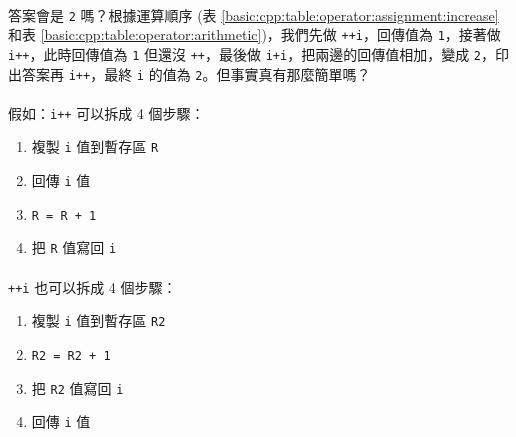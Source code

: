 \documentclass[12pt,a4paper,oneside]{article}
\begin{document}
\begin{CJK}{UTF8}{bkai}
\paragraph{}答案會是 \lstinline!2! 嗎？根據運算順序 (表 \ref{basic:cpp:table:operator:assignment:increase} 和表 \ref{basic:cpp:table:operator:arithmetic})，我們先做 \lstinline!++i!，回傳值為 \lstinline!1!，接著做 \lstinline!i++!，此時回傳值為 \lstinline!1! 但還沒 \lstinline!++!，最後做 \lstinline!i+i!，把兩邊的回傳值相加，變成 \lstinline!2!，印出答案再 \lstinline!i++!，最終 \lstinline!i! 的值為 \lstinline!2!。但事實真有那麼簡單嗎？

\paragraph{}假如：\lstinline!i++! 可以拆成 4 個步驟：
\begin{enumerate}
\item {\color{blue}複製 \lstinline!i! 值到暫存區 \lstinline!R!}
\item {\color{blue}回傳 \lstinline!i! 值}
\item {\color{blue}\lstinline!R = R + 1!}
\item {\color{blue}把 \lstinline!R! 值寫回 \lstinline!i!}
\end{enumerate}

\paragraph{}\lstinline!++i! 也可以拆成 4 個步驟：
\begin{enumerate}
\item {\color{red}複製 \lstinline!i! 值到暫存區 \lstinline!R2!}
\item {\color{red}\lstinline!R2 = R2 + 1!}
\item {\color{red}把 \lstinline!R2! 值寫回 \lstinline!i!}
\item {\color{red}回傳 \lstinline!i! 值}
\end{enumerate}


\end{CJK}
\end{document}
